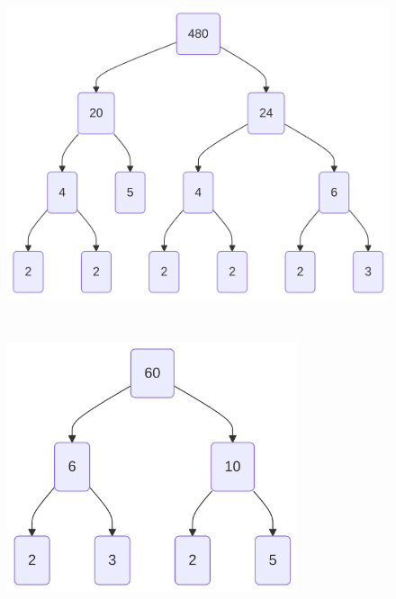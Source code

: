 \documentclass[
  letterpaper,
  DIV=11,
  numbers=noendperiod]{scrreprt}
\begin{document}
\begin{figure}

\begin{minipage}{0.50\linewidth}

\label{mermaid-diagram}
\includegraphics[width=5.2in,height=3.98in]{chapters/Unit_1/1.3_GCF_&_Simplifying_Fractions_files/figure-latex/mermaid-figure-11.png}

\end{minipage}%
%
\begin{minipage}{0.50\linewidth}

\label{mermaid-diagram}
\includegraphics[width=3.35in,height=2.9in]{chapters/Unit_1/1.3_GCF_&_Simplifying_Fractions_files/figure-latex/mermaid-figure-10.png}

\end{minipage}%

\end{figure}%
\end{document}
